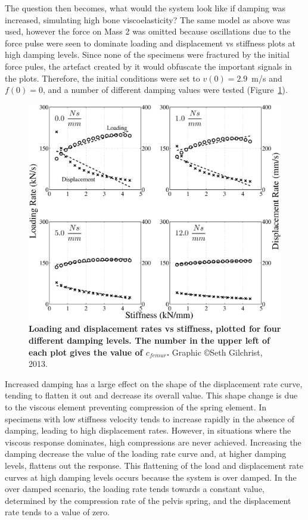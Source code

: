 The question then becomes, what would the system look like if damping was increased, simulating high bone viscoelasticity?
The same model as above was used, however the force on Mass 2 was omitted because oscillations due to the force pulse were seen to dominate loading and displacement \ac{vs} stiffness plots at high damping levels.
Since none of the specimens were fractured by the initial force pules, the artefact created by it would obfuscate the important signals in the plots.
Therefore, the initial conditions were set to $v(0) = 2.9$~\ac{m}/\ac{s} and $f(0) = 0 $, and a number of different damping values were tested (Figure~\ref{fig:ratesVsDamping}).

\begin{figure}
\centering
\includegraphics[width=\linewidth]{./behave_fail/Figures/ratesVsDamping}
\caption[Ideal loading and displacement rates as a function stiffness and damping]{\textbf{Loading and displacement rates \acs{vs} stiffness, plotted for four different damping levels. The number in the upper left of each plot gives the value of $c_{femur}$.} Graphic \copyright Seth Gilchrist, 2013.}
\label{fig:ratesVsDamping}
\end{figure}

Increased damping has a large effect on the shape of the displacement rate curve, tending to flatten it out and decrease its overall value.
This shape change is due to the viscous element preventing compression of the spring element.
In specimens with low stiffness velocity tends to increase rapidly in the absence of damping, leading to high displacement rates.
However, in situations where the viscous response dominates, high compressions are never achieved.
Increasing the damping decrease the value of the loading rate curve and, at higher damping levels, flattens out the response.
This flattening of the load and displacement rate curves at high damping levels occurs because the system is over damped.
In the over damped scenario, the loading rate tends towards a constant value, determined by the compression rate of the pelvis spring, and the displacement rate tends to a value of zero.

